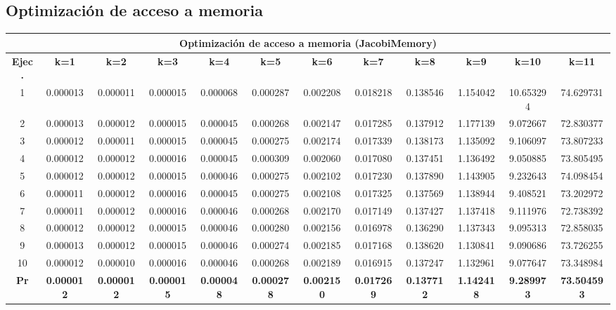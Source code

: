 \documentclass{article}
\begin{document}
\subsection{Optimización de acceso a memoria}

\begin{table}[H]
\centering
\tiny
\begin{tabular}{|c|c|c|c|c|c|c|c|c|c|c|c|}
\hline
\multicolumn{12}{|c|}{\textbf{Optimización de acceso a memoria (JacobiMemory)}} \\
\hline
\textbf{Ejec.} & \textbf{k=1} & \textbf{k=2} & \textbf{k=3} & \textbf{k=4} & \textbf{k=5} & \textbf{k=6} & \textbf{k=7} & \textbf{k=8} & \textbf{k=9} & \textbf{k=10} & \textbf{k=11} \\
\hline
1  & 0.000013 & 0.000011 & 0.000015 & 0.000068 & 0.000287 & 0.002208 & 0.018218 & 0.138546 & 1.154042 & 10.653294 & 74.629731 \\
2  & 0.000013 & 0.000012 & 0.000015 & 0.000045 & 0.000268 & 0.002147 & 0.017285 & 0.137912 & 1.177139 &  9.072667 & 72.830377 \\
3  & 0.000012 & 0.000011 & 0.000015 & 0.000045 & 0.000275 & 0.002174 & 0.017339 & 0.138173 & 1.135092 &  9.106097 & 73.807233 \\
4  & 0.000012 & 0.000012 & 0.000016 & 0.000045 & 0.000309 & 0.002060 & 0.017080 & 0.137451 & 1.136492 &  9.050885 & 73.805495 \\
5  & 0.000012 & 0.000012 & 0.000015 & 0.000046 & 0.000275 & 0.002102 & 0.017230 & 0.137890 & 1.143905 &  9.232643 & 74.098454 \\
6  & 0.000011 & 0.000012 & 0.000016 & 0.000045 & 0.000275 & 0.002108 & 0.017325 & 0.137569 & 1.138944 &  9.408521 & 73.202972 \\
7  & 0.000011 & 0.000012 & 0.000016 & 0.000046 & 0.000268 & 0.002170 & 0.017149 & 0.137427 & 1.137418 &  9.111976 & 72.738392 \\
8  & 0.000012 & 0.000012 & 0.000015 & 0.000046 & 0.000280 & 0.002156 & 0.016978 & 0.136290 & 1.137343 &  9.095313 & 72.858035 \\
9  & 0.000013 & 0.000012 & 0.000015 & 0.000046 & 0.000274 & 0.002185 & 0.017168 & 0.138620 & 1.130841 &  9.090686 & 73.726255 \\
10 & 0.000012 & 0.000010 & 0.000016 & 0.000046 & 0.000268 & 0.002189 & 0.016915 & 0.137247 & 1.132961 &  9.077647 & 73.348984 \\
\hline
\textbf{Pr} & \textbf{0.000012} & \textbf{0.000012} & \textbf{0.000015} & \textbf{0.000048} & \textbf{0.000278} & \textbf{0.002150} & \textbf{0.017269} & \textbf{0.137712} & \textbf{1.142418} & \textbf{9.289973} & \textbf{73.504593} \\

\end{tabular}
\end{table}
\end{document}
